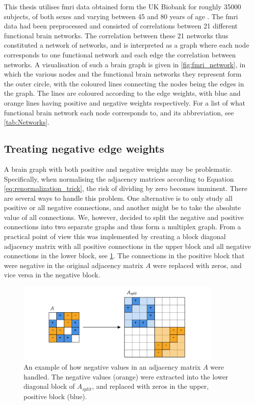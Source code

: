This thesis utilises \acrshort{fmri} data obtained form the UK Biobank for roughly 35000 subjects, of both sexes and varying between 45 and 80 years of age \cite{ukbiobank}. The \acrshort{fmri} data had been preprocessed and consisted of correlations between 21 different functional brain networks. The correlation between these 21 networks thus constituted a network of networks, and is interpreted as a graph where each node corresponds to one functional network and each edge the correlation between networks. A visualisation of such a brain graph is given in \cref{fig:fmri_network}, in which the various nodes and the functional brain networks they represent form the outer circle, with the coloured lines connecting the nodes being the edges in the graph. The lines are coloured according to the edge weights, with blue and orange lines having positive and negative weights respectively. For a list of what functional brain network each node corresponds to, and its abbreviation, see \cref{tab:Networks}.

\subsection{Treating negative edge weights}
A brain graph with both positive and negative weights may be problematic. Specifically, when normalising the adjacency matrices according to Equation \eqref{eq:renormalization_trick}, the risk of dividing by zero becomes imminent. There are several ways to handle this problem. One alternative is to only study all positive or all negative connections, and another might be to take the absolute value of all connections. We, however, decided to split the negative and positive connections into two separate graphs and thus form a multiplex graph. From a practical point of view this was implemented by creating a block diagonal adjacency matrix with all positive connections in the upper block and all negative connections in the lower block, see \cref{fig:block_diagonal_adjacency_matrix}. The connections in the positive block that were negative in the original adjacency matrix $A$ were replaced with zeros, and vice versa in the negative block.

\begin{figure}[!htbp]
    \centering
    \includegraphics[width=0.9\textwidth]{chapters/images_methods/split.png}
    \caption{An example of how negative values in an adjacency matrix $A$ were handled. The negative values (orange) were extracted into the lower diagonal block of $A_{split}$, and replaced with zeros in the upper, positive block (blue).}
    \label{fig:block_diagonal_adjacency_matrix}
\end{figure}

